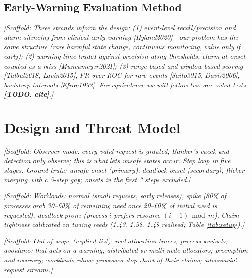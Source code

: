 \documentclass[conference]{IEEEtran}
\newcommand{\scaffold}[1]{\textcolor{blue!60!black}{\textit{[Scaffold: #1]}}}
\newcommand{\todocite}{\textcolor{red!70!black}{\textbf{[TODO: cite]}}}
\begin{document}
\subsection{Early-Warning Evaluation Method}\label{sec:bg-method}
\scaffold{Three strands inform the design: (1) event-level recall/precision and alarm silencing from clinical early warning [Hyland2020]---our problem has the same structure (rare harmful state change, continuous monitoring, value only if early); (2) warning time traded against precision along thresholds, alarm at onset counted as a miss [Munchmeyer2021]; (3) range-based and window-based scoring [Tatbul2018, Lavin2015], PR over ROC for rare events [Saito2015, Davis2006], bootstrap intervals [Efron1993]. For equivalence we will follow two one-sided tests \todocite.}

\section{Design and Threat Model}\label{sec:design}

\scaffold{Observer mode: every valid request is granted; Banker's check and detection only observe; this is what lets unsafe states occur. Step loop in five stages. Ground truth: unsafe onset (primary), deadlock onset (secondary); flicker merging with a 5-step gap; onsets in the first 3 steps excluded.}

\scaffold{Workloads: normal (small requests, early releases), spike (80\% of processes grab 30--60\% of remaining need once 20--60\% of initial need is requested), deadlock-prone (process $i$ prefers resource $(i{+}1)\bmod m$). Claim tightness calibrated on tuning seeds (1.43, 1.58, 1.48 realised; Table~\ref{tab:setup}).}

\scaffold{Out of scope (explicit list): real allocation traces; process arrivals; avoidance that acts on a warning; distributed or multi-node allocators; preemption and recovery; workloads whose processes stop short of their claims; adversarial request streams.}
\end{document}
